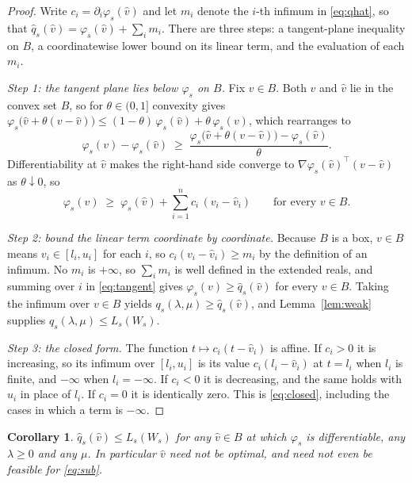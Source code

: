 \documentclass[11pt]{article}
\theoremstyle{plain}
\newtheorem{corollary}[lemma]{Corollary}
\theoremstyle{remark}
\newcommand{\W}{W}
\newcommand{\vhat}{\hat{v}}
\newcommand{\qhat}{\hat{q}}
\begin{document}
\begin{proof}
Write $c_i = \partial_i \varphi_s(\vhat)$ and let $m_i$ denote the $i$-th
infimum in \eqref{eq:qhat}, so that
$\qhat_s(\vhat) = \varphi_s(\vhat) + \sum_i m_i$.  There are three steps: a
tangent-plane inequality on $B$, a coordinatewise lower bound on its linear
term, and the evaluation of each $m_i$.

\emph{Step 1: the tangent plane lies below $\varphi_s$ on $B$.}  Fix
$v \in B$.  Both $v$ and $\vhat$ lie in the convex set $B$, so for
$\theta \in (0,1]$ convexity gives
$\varphi_s\bigl(\vhat + \theta(v - \vhat)\bigr)
  \le (1-\theta)\,\varphi_s(\vhat) + \theta\,\varphi_s(v)$, which rearranges to
\[
  \varphi_s(v) - \varphi_s(\vhat) \;\ge\;
  \frac{\varphi_s\bigl(\vhat + \theta(v - \vhat)\bigr) - \varphi_s(\vhat)}{\theta}.
\]
Differentiability at $\vhat$ makes the right-hand side converge to
$\nabla \varphi_s(\vhat)^{\top}(v - \vhat)$ as $\theta \downarrow 0$, so
\begin{equation}\label{eq:tangent}
  \varphi_s(v) \;\ge\; \varphi_s(\vhat) + \sum_{i=1}^{n} c_i\,(v_i - \vhat_i)
  \qquad \text{for every } v \in B .
\end{equation}

\emph{Step 2: bound the linear term coordinate by coordinate.}  Because $B$ is a
box, $v \in B$ means $v_i \in [l_i, u_i]$ for each $i$, so
$c_i (v_i - \vhat_i) \ge m_i$ by the definition of an infimum.  No $m_i$ is
$+\infty$, so $\sum_i m_i$ is well defined in the extended reals, and summing
over $i$ in \eqref{eq:tangent} gives $\varphi_s(v) \ge \qhat_s(\vhat)$ for
every $v \in B$.  Taking the infimum over $v \in B$ yields
$q_s(\lambda,\mu) \ge \qhat_s(\vhat)$, and Lemma~\ref{lem:weak} supplies
$q_s(\lambda,\mu) \le L_s(\W_s)$.

\emph{Step 3: the closed form.}  The function $t \mapsto c_i (t - \vhat_i)$ is
affine.  If $c_i > 0$ it is increasing, so its infimum over $[l_i, u_i]$ is its
value $c_i(l_i - \vhat_i)$ at $t = l_i$ when $l_i$ is finite, and $-\infty$ when
$l_i = -\infty$.  If $c_i < 0$ it is decreasing, and the same holds with $u_i$
in place of $l_i$.  If $c_i = 0$ it is identically zero.  This is
\eqref{eq:closed}, including the cases in which a term is $-\infty$.
\end{proof}

\begin{corollary}\label{cor:anypoint}
$\qhat_s(\vhat) \le L_s(\W_s)$ for \emph{any} $\vhat \in B$ at which
$\varphi_s$ is differentiable, \emph{any} $\lambda \ge 0$ and \emph{any} $\mu$.  In particular
$\vhat$ need not be optimal, and need not even be feasible for \eqref{eq:sub}.
\end{corollary}
\end{document}

